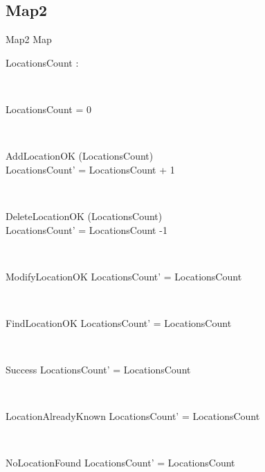 \documentclass[12pt]{article}
\begin{document}
\begin{spacing}{1.5}
\section{Map2}
\begin{class}{Map2}
\also
Map \\
\begin{state}
LocationsCount : 
\end{state} \\
\begin{init}
LocationsCount = 0
\end{init} \\
\begin{op}{AddLocationOK}
\Delta (LocationsCount) \\
\ST
LocationsCount' = LocationsCount + 1
\end{op}\\
\begin{op}{DeleteLocationOK}
\Delta (LocationsCount) \\
\ST
LocationsCount' = LocationsCount -1
\end{op}\\
\begin{op}{ModifyLocationOK}
\ST
LocationsCount' = LocationsCount
\end{op}\\ 
\begin{op}{FindLocationOK}
\ST
LocationsCount' = LocationsCount
\end{op}\\
\begin{op}{Success}
\ST
LocationsCount' = LocationsCount
\end{op}\\
\begin{op}{LocationAlreadyKnown}
\ST
LocationsCount' = LocationsCount
\end{op}\\ 
\begin{op}{NoLocationFound}
\ST
LocationsCount' = LocationsCount
\end{op}\\
\end{class}




\end{spacing}
\end{document}
